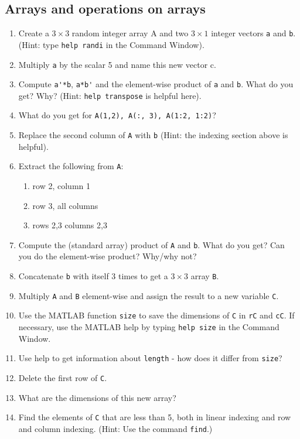 \documentclass[11pt]{amsart}
\begin{document}
\subsection{Arrays and operations on arrays}
\begin{enumerate}
\item Create a $3 \times 3$ random integer array A and two $3 \times 1$ integer vectors \verb+a+ and \verb+b+. (Hint: type \verb+help randi+ in the Command Window).
\item Multiply \verb+a+ by the scalar 5 and name this new vector c.
\item Compute \verb+a'*b+, \verb+a*b'+ and the element-wise product of \verb+a+ and \verb+b+. What do you get?  Why? (Hint: \verb+help transpose+ is helpful here).
\item What do you get for \verb+A(1,2), A(:, 3), A(1:2, 1:2)+? 
\item Replace the second column of \verb+A+ with \verb+b+ (Hint: the indexing section above is helpful).
\item Extract the following from \verb+A+: 
	\begin{enumerate}
	\item row 2, column 1
	\item row 3, all columns
	\item rows 2,3 columns 2,3 
	\end{enumerate}
\item Compute the (standard array) product of \verb+A+ and \verb+b+. What do you get? Can you do the element-wise product? Why/why not?
\item Concatenate \verb+b+ with itself 3 times to get a $3 \times 3$ array \verb+B+.
\item Multiply \verb+A+ and \verb+B+ element-wise and assign the result to a new variable \verb+C+.
\item Use the MATLAB function \verb+size+ to save the dimensions of \verb+C+ in \verb+rC+ and \verb+cC+. If necessary, use the MATLAB help by typing \verb+help size+ in the Command Window.
\item Use help to get information about \verb+length+ - how does it differ from \verb+size+?
\item Delete the first row of \verb+C+.
\item What are the dimensions of this new array?
\item Find the elements of \verb+C+ that are less than 5, both in linear indexing and row and column indexing. (Hint: Use the command \verb+find+.)
\end{enumerate}
\end{document}
